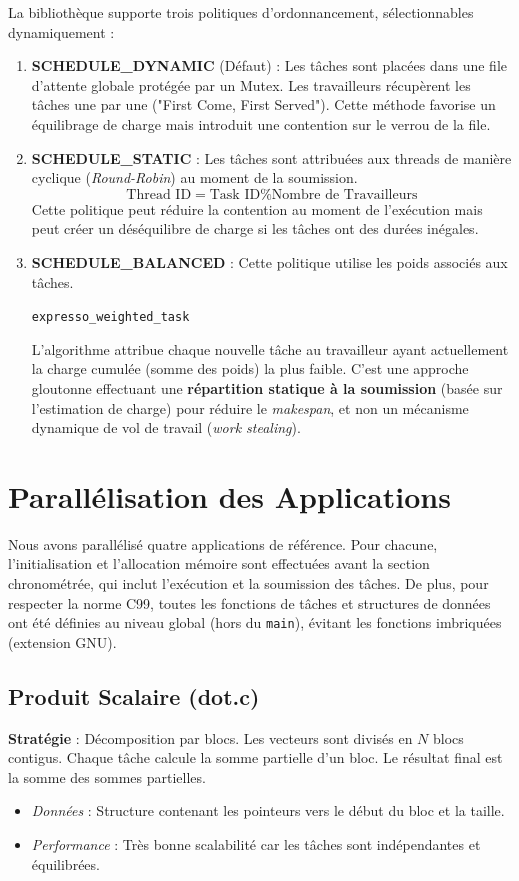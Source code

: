 \documentclass[a4paper,11pt]{article}
\begin{document}
La bibliothèque supporte trois politiques d'ordonnancement, sélectionnables dynamiquement :

\begin{enumerate}
    \item \textbf{SCHEDULE\_DYNAMIC} (Défaut) : Les tâches sont placées dans une file d'attente globale protégée par un Mutex. Les travailleurs récupèrent les tâches une par une ("First Come, First Served"). Cette méthode favorise un équilibrage de charge mais introduit une contention sur le verrou de la file.
    
    \item \textbf{SCHEDULE\_STATIC} : Les tâches sont attribuées aux threads de manière cyclique (\textit{Round-Robin}) au moment de la soumission.
    \[ \text{Thread ID} = \text{Task ID} \% \text{Nombre de Travailleurs} \]
    Cette politique peut réduire la contention au moment de l'exécution mais peut créer un déséquilibre de charge si les tâches ont des durées inégales.
    
    \item \textbf{SCHEDULE\_BALANCED} : Cette politique utilise les poids associés aux tâches.
    
    \texttt{expresso\_weighted\_task}
    
    L'algorithme attribue chaque nouvelle tâche au travailleur ayant actuellement la charge cumulée (somme des poids) la plus faible. C'est une approche gloutonne effectuant une \textbf{répartition statique à la soumission} (basée sur l'estimation de charge) pour réduire le \textit{makespan}, et non un mécanisme dynamique de vol de travail (\textit{work stealing}).
\end{enumerate}

\section{Parallélisation des Applications}

Nous avons parallélisé quatre applications de référence. Pour chacune, l'initialisation et l'allocation mémoire sont effectuées avant la section chronométrée, qui inclut l'exécution et la soumission des tâches. De plus, pour respecter la norme C99, toutes les fonctions de tâches et structures de données ont été définies au niveau global (hors du \texttt{main}), évitant les fonctions imbriquées (extension GNU).

\subsection{Produit Scalaire (dot.c)}
\textbf{Stratégie} : Décomposition par blocs.
Les vecteurs sont divisés en $N$ blocs contigus. Chaque tâche calcule la somme partielle d'un bloc. Le résultat final est la somme des sommes partielles.
\begin{itemize}
    \item \textit{Données} : Structure contenant les pointeurs vers le début du bloc et la taille.
    \item \textit{Performance} : Très bonne scalabilité car les tâches sont indépendantes et équilibrées.
\end{itemize}
\end{document}
